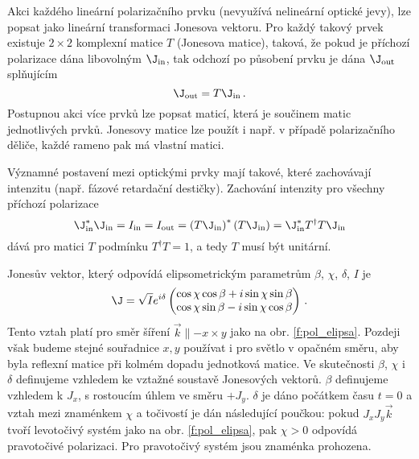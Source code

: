 Akci každého lineární polarizačního prvku (nevyužívá nelineární optické jevy), lze popsat jako lineární transformaci Jonesova vektoru.
Pro každý takový prvek existuje $2\times 2$ komplexní matice $T$ (Jonesova matice), taková, že pokud je příchozí polarizace dána libovolným $\J_{\textrm{in}}$, tak odchozí po působení prvku je dána $\J_{\textrm{out}}$ splňujícím
\begin{equation}
\J_{\textrm{out}}=T \J_{\textrm{in}} \,.
\end{equation}
Postupnou akci více prvků lze popsat maticí, která je součinem matic jednotlivých prvků.
Jonesovy matice lze použít i např. v případě polarizačního děliče, každé rameno pak má vlastní matici.

Významné postavení mezi optickými prvky mají takové, které zachovávají intenzitu (např. fázové retardační destičky).
Zachování intenzity pro všechny příchozí polarizace
\begin{equation}
\J_{\textrm{in}}^*\J_{\textrm{in}}=I_{\textrm{in}}=I_{\textrm{out}}=\left(T \J_{\textrm{in}}\right)^* \left(T \J_{\textrm{in}}\right)=\J_{\textrm{in}}^* T^\dagger T \J_{\textrm{in}}
\end{equation}
dává pro matici $T$ podmínku $T^\dagger T=1$, a tedy $T$ musí být unitární.

Jonesův vektor, který odpovídá elipsometrickým parametrům $\beta$, $\chi$, $\delta$, $I$ je
\begin{equation} \label{e:jones uhly}
\J=\sqrt{I} e^{i\delta} \begin{pmatrix}
\cos \chi \cos \beta + i \sin \chi \sin \beta \\
\cos \chi \sin \beta - i \sin \chi \cos \beta
\end{pmatrix} \,.
\end{equation}
Tento vztah platí pro směr šíření $\vec{k} \parallel -x \times y$ jako na obr. \ref{f:pol_elipsa}.
Pozdeji však budeme stejné souřadnice $x,y$ používat i pro světlo v opačném směru, aby byla reflexní matice při kolmém dopadu jednotková matice.
Ve skutečnosti $\beta$, $\chi$ i $\delta$ definujeme vzhledem ke vztažné soustavě Jonesových vektorů.
$\beta$ definujeme vzhledem k $J_x$, s rostoucím úhlem ve směru $+J_y$. 
$\delta$ je dáno počátkem času $t=0$ a vztah mezi znaménkem $\chi$ a točivostí je dán následující poučkou: pokud $J_x J_y \vec{k}$ tvoří levotočivý systém jako na obr. \ref{f:pol_elipsa}, pak $\chi>0$ odpovídá pravotočivé polarizaci. 
Pro pravotočivý systém jsou znaménka prohozena.

